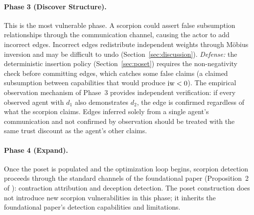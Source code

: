 \paragraph{Phase 3 (Discover Structure).} This is the most vulnerable phase.
A scorpion could assert false subsumption relationships through the
communication channel, causing the actor to add incorrect edges. Incorrect
edges redistribute independent weights through M\"{o}bius inversion and may
be difficult to undo (Section~\ref{sec:discussion}). \emph{Defense:} the
deterministic insertion policy (Section~\ref{sec:poset}) requires the
non-negativity check before committing edges, which catches some false claims
(a claimed subsumption between capabilities that would produce $\operatorname{iw} < 0$).
The empirical observation mechanism of Phase~3 provides independent
verification: if every observed agent with $d_1$ also demonstrates $d_2$, the
edge is confirmed regardless of what the scorpion claims. Edges inferred
solely from a single agent's communication and not confirmed by observation
should be treated with the same trust discount as the agent's other claims.

\paragraph{Phase 4 (Expand).} Once the poset is populated and the
optimization loop begins, scorpion detection proceeds through the standard
channels of the foundational paper (Proposition~2 of \citet{lasser2026gfm}):
contraction attribution and deception detection. The poset construction
does not introduce new scorpion vulnerabilities in this phase; it inherits the
foundational paper's detection capabilities and limitations.
